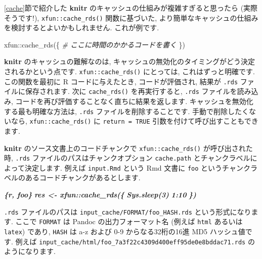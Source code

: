 \documentclass[
  11pt,
]{bxjsreport}
\newenvironment{Shaded}{\begin{snugshade}}{\end{snugshade}}
\newcommand{\CommentTok}[1]{\textcolor[rgb]{0.56,0.35,0.01}{\textit{#1}}}
\newcommand{\FunctionTok}[1]{\textcolor[rgb]{0.00,0.00,0.00}{#1}}
\newcommand{\InformationTok}[1]{\textcolor[rgb]{0.56,0.35,0.01}{\textbf{\textit{#1}}}}
\newcommand{\NormalTok}[1]{#1}
\newcommand{\SpecialCharTok}[1]{\textcolor[rgb]{0.00,0.00,0.00}{#1}}
\begin{document}
\ref{cache}節で紹介した \textbf{knitr} のキャッシュの仕組みが複雑すぎると思ったら (実際そうです!), \texttt{xfun::cache\_rds()} 関数に基づいた, より簡単なキャッシュの仕組みを検討するとよいかもしれません. これが例です.

\begin{Shaded}
\begin{Highlighting}[numbers=left,,]
\NormalTok{xfun}\SpecialCharTok{::}\FunctionTok{cache\_rds}\NormalTok{(\{}
  \CommentTok{\# ここに時間のかかるコードを書く}
\NormalTok{\})}
\end{Highlighting}
\end{Shaded}

\textbf{knitr} のキャッシュの難解なのは, キャッシュの無効化のタイミングがどう決定されるかという点です. \texttt{xfun::cache\_rds()} にとっては, これはずっと明確です. この関数を最初に R コードに与えたとき, コードが評価され, 結果が \texttt{.rds} ファイルに保存されます. 次に \texttt{cache\_rds()} を再実行すると, \texttt{.rds} ファイルを読み込み, コードを再び評価することなく直ちに結果を返します. キャッシュを無効化する最も明確な方法は, \texttt{.rds} ファイルを削除することです. 手動で削除したくないなら, \texttt{xfun::cache\_rds()} に \texttt{return = TRUE} 引数を付けて呼び出すこともできます.

\textbf{knitr} のソース文書上のコードチャンクで \texttt{xfun::cache\_rds()} が呼び出された時, \texttt{.rds} ファイルのパスはチャンクオプション \texttt{cache.path} とチャンクラベルによって決定します. 例えば \texttt{input.Rmd} という Rmd 文書に \texttt{foo} というチャンクラベルのあるコードチャンクがあるとします.

\begin{Shaded}
\begin{Highlighting}[]
\InformationTok{\textasciigrave{}\textasciigrave{}\textasciigrave{}\{r, foo\}}
\InformationTok{res \textless{}{-} xfun::cache\_rds(\{}
\InformationTok{  Sys.sleep(3)}
\InformationTok{  1:10}
\InformationTok{\})}
\InformationTok{\textasciigrave{}\textasciigrave{}\textasciigrave{}}
\end{Highlighting}
\end{Shaded}

\texttt{.rds} ファイルのパスは \texttt{input\_cache/FORMAT/foo\_HASH.rds} という形式になります. ここで \texttt{FORMAT} は Pandoc の出力フォーマット名 (例えば \texttt{html} あるいは \texttt{latex}) であり, \texttt{HASH} は a-z および 0-9 からなる32桁の16進 MD5 ハッシュ値です. 例えば \texttt{input\_cache/html/foo\_7a3f22c4309d400eff95de0e8bddac71.rds} のようになります.
\end{document}

